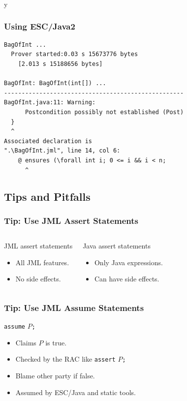 \if y\MAKEHANDOUTS \documentclass[t,compress,landscape,handout]{beamer}
\begin{document}
\begin{frame}[fragile]
\frametitle{Using ESC/Java2}

{\small
\begin{verbatim}
BagOfInt ...
  Prover started:0.03 s 15673776 bytes
    [2.013 s 15188656 bytes]

BagOfInt: BagOfInt(int[]) ...
---------------------------------------------------
BagOfInt.java:11: Warning: 
      Postcondition possibly not established (Post)
  }
  ^
Associated declaration is 
".\BagOfInt.jml", line 14, col 6:
    @ ensures (\forall int i; 0 <= i && i < n;
      ^
\end{verbatim}
}
\end{frame}

\subsection[Tips/Pitfalls]{Tips and Pitfalls}

\begin{frame}
\frametitle{Tip: Use JML Assert Statements}

\begin{columns}[t]
\begin{block}{JML assert statements}
\begin{itemize}
\item
All JML features.

\item
No side effects.
\end{itemize}
\end{block}

\begin{block}{Java assert statements}
\begin{itemize}
\item
Only Java expressions.

\item
Can have side effects.
\end{itemize}
\end{block}
\end{columns}

\end{frame}

\begin{frame}[fragile]
\frametitle{Tip: Use JML Assume Statements}

\lstinline!assume! $P$\texttt{;}

\begin{itemize}
\item
Claims $P$ is true.

\item
Checked by the RAC like \lstinline!assert! $P$\texttt{;}

\item
Blame other party if false.

\item
Assumed by ESC/Java and static tools.
\end{itemize}
\end{frame}
\end{document}
